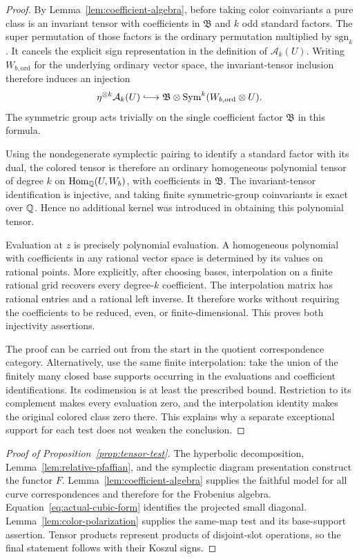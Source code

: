 \begin{proof}
By Lemma~\ref{lem:coefficient-algebra}, before taking color
coinvariants a pure class is an invariant tensor with coefficients
in \(\mathfrak B\) and \(k\) odd standard factors.  The super
permutation of those factors is the ordinary permutation multiplied
by \(\mathrm{sgn}_k\).  It cancels the explicit sign representation
in the definition of \(\mathcal A_k(U)\).
Writing \(W_{b,\mathrm{ord}}\) for the underlying ordinary vector
space, the invariant-tensor inclusion therefore induces an injection
\[
 \eta^{\otimes k}\mathcal A_k(U)
 \lhook\joinrel\longrightarrow
 \mathfrak B\otimes
 \Sym^k(W_{b,\mathrm{ord}}\otimes U).
\]
The symmetric group acts trivially on the single coefficient factor
\(\mathfrak B\) in this formula.

Using the nondegenerate symplectic pairing to identify a standard
factor with its dual, the colored tensor is therefore an ordinary
homogeneous polynomial tensor of degree \(k\) on
\(\operatorname{Hom}_\mathbb Q(U,W_b)\), with coefficients in \(\mathfrak B\).
The invariant-tensor identification is injective, and taking finite
symmetric-group coinvariants is exact over \(\mathbb Q\).  Hence no
additional kernel was introduced in obtaining this polynomial
tensor.

Evaluation at \(z\) is precisely polynomial evaluation.  A
homogeneous polynomial with coefficients in any rational vector
space is determined by its values on rational points.  More
explicitly, after choosing bases, interpolation on a finite rational
grid recovers every degree-\(k\) coefficient.  The interpolation
matrix has rational entries and a rational left inverse.  It
therefore works without requiring the coefficients to be reduced,
even, or finite-dimensional.  This proves both injectivity
assertions.

The proof can be carried out from the start in the quotient
correspondence category.  Alternatively, use the same finite
interpolation: take the union of the finitely many closed base
supports occurring in the evaluations and coefficient
identifications.  Its codimension is at least the prescribed bound.
Restriction to its complement makes every evaluation zero, and the
interpolation identity makes the original colored class zero
there.  This explains why a separate exceptional support for each
test does not weaken the conclusion.
\end{proof}

\begin{proof}[Proof of Proposition~\ref{prop:tensor-test}]
The hyperbolic decomposition, Lemma~\ref{lem:relative-pfaffian}, and
the symplectic diagram presentation construct the functor \(F\).
Lemma~\ref{lem:coefficient-algebra} supplies the faithful model for
all curve correspondences and therefore for the Frobenius algebra.
Equation~\eqref{eq:actual-cubic-form} identifies the projected small
diagonal.  Lemma~\ref{lem:color-polarization} supplies the
same-map test and its base-support assertion.  Tensor products
represent products of disjoint-slot operations, so the final
statement follows with their Koszul signs.
\end{proof}
